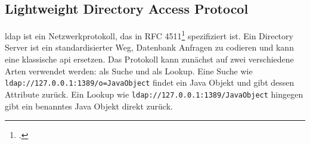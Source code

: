 
\subsection{Lightweight Directory Access Protocol}\label{subsec:ldap}
\gls{ldap} ist ein Netzwerkprotokoll, das in RFC 4511\footcite{rfc4511} spezifiziert ist.
Ein  Directory Server ist ein standardisierter Weg, Datenbank Anfragen zu codieren und kann eine klassische \gls{api} ersetzen.
Das  Protokoll kann zunächst auf zwei verschiedene Arten verwendet werden: als Suche und als Lookup.
Eine Suche wie \verb|ldap://127.0.0.1:1389/o=JavaObject| findet ein Java Objekt und gibt dessen Attribute zurück.
Ein Lookup wie \verb|ldap://127.0.0.1:1389/JavaObject| hingegen gibt ein benanntes Java Objekt direkt zurück.
